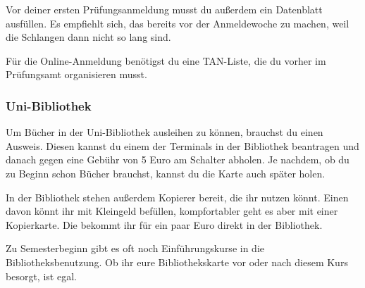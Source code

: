 \begin{multicols}{2}
	Vor deiner ersten Prüfungsanmeldung musst du außerdem ein Datenblatt ausfüllen. Es empfiehlt sich, das bereits vor der Anmeldewoche zu machen, weil die Schlangen dann nicht so lang sind.

	Für die Online-Anmeldung benötigst du eine TAN-Liste, die du vorher im Prüfungsamt organisieren musst.

\subsubsection{Uni-Bibliothek}
	\label{todobib}

	Um Bücher in der Uni-Bibliothek ausleihen zu können, brauchst du einen Ausweis. Diesen kannst du einem der Terminals in der Bibliothek beantragen und danach gegen eine Gebühr von 5 Euro am Schalter abholen. Je nachdem, ob du zu Beginn schon Bücher brauchst, kannst du die Karte auch später holen.

	In der Bibliothek stehen außerdem Kopierer bereit, die ihr nutzen könnt. Einen davon könnt ihr mit Kleingeld befüllen, kompfortabler geht es aber mit einer Kopierkarte. Die bekommt ihr für ein paar Euro direkt in der Bibliothek.

	Zu Semesterbeginn gibt es oft noch Einführungskurse in die Bibliotheksbenutzung. Ob ihr eure Bibliothekskarte vor oder nach diesem Kurs besorgt, ist egal.
\end{multicols}
